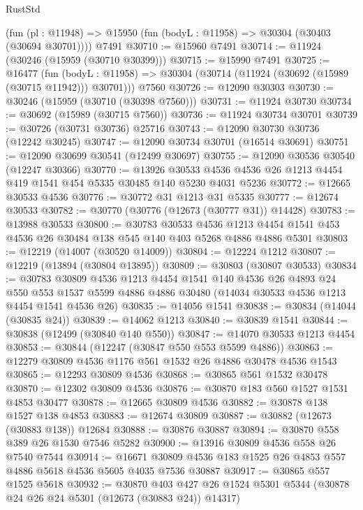\begin{lexlean}{RustStd}
\begin{coremodule}
    (fun (pl : @11948) => @15950 (fun (bodyL : @11958) => @30304 (@30403 (@30694 @30701))))
    @7491
@30710 := @15960 @7491
@30714 := @11924 (@30246 (@15959 (@30710 @30399)))
@30715 := @15990 @7491
@30725 := @16477
    (fun (bodyL : @11958) => @30304 (@30714 (@11924 (@30692 (@15989 (@30715 @11942))) @30701)))
    @7560
@30726 := @12090 @30303
@30730 := @30246 (@15959 (@30710 (@30398 @7560)))
@30731 := @11924 @30730
@30734 := @30692 (@15989 (@30715 @7560))
@30736 := @11924 @30734 @30701
@30739 := @30726 (@30731 @30736) @25716
@30743 := @12090 @30730 @30736 (@12242 @30245)
@30747 := @12090 @30734 @30701 (@16514 @30691)
@30751 := @12090 @30699 @30541 (@12499 @30697)
@30755 := @12090 @30536 @30540 (@12247 @30366)
@30770 := @13926
    @30533
    @4536
    @4536
    @26
    @1213
    @4454
    @419
    @1541
    @454
    @5335
    @30485
    @140
    @5230
    @4031
    @5236
@30772 := @12665 @30533 @4536
@30776 := @30772 @31 @1213 @31 @5335
@30777 := @12674 @30533
@30782 := @30770 (@30776 (@12673 (@30777 @31)) @14428)
@30783 := @13988 @30533
@30800 := @30783
    @30533
    @4536
    @1213
    @4454
    @1541
    @453
    @4536
    @26
    @30484
    @138
    @545
    @140
    @403
    @5268
    @4886
    @4886
    @5301
@30803 := @12219 (@14007 (@30520 @14009))
@30804 := @12224 @1212
@30807 := @12219 (@13894 (@30804 @13895))
@30809 := @30803 (@30807 @30533)
@30834 := @30783
    @30809
    @4536
    @1213
    @4454
    @1541
    @140
    @4536
    @26
    @4893
    @24
    @550
    @553
    @1537
    @5599
    @4886
    @4886
    @30480
    (@14034 @30533 @4536 @1213 @4454 @1541 @4536 @26)
@30835 := @14056 @1541
@30838 := @30834 (@14044 (@30835 @24))
@30839 := @14062 @1213
@30840 := @30839 @1541
@30844 := @30838 (@12499 (@30840 @140 @550))
@30847 := @14070 @30533 @1213 @4454
@30853 := @30844 (@12247 (@30847 @550 @553 @5599 @4886))
@30863 := @12279 @30809 @4536 @1176 @561 @1532 @26 @4886 @30478 @4536 @1543
@30865 := @12293 @30809 @4536
@30868 := @30865 @561 @1532 @30478
@30870 := @12302 @30809 @4536
@30876 := @30870 @183 @560 @1527 @1531 @4853 @30477
@30878 := @12665 @30809 @4536
@30882 := @30878 @138 @1527 @138 @4853
@30883 := @12674 @30809
@30887 := @30882 (@12673 (@30883 @138)) @12684
@30888 := @30876 @30887
@30894 := @30870 @558 @389 @26 @1530 @7546 @5282
@30900 := @13916 @30809 @4536 @558 @26 @7540 @7544
@30914 := @16671 @30809 @4536 @183 @1525 @26 @4853 @557 @4886 @5618 @4536 @5605 @4035 @7536 @30887
@30917 := @30865 @557 @1525 @5618
@30932 := @30870
    @403
    @427
    @26
    @1524
    @5301
    @5344
    (@30878 @24 @26 @24 @5301 (@12673 (@30883 @24)) @14317)

\end{coremodule}
\end{lexlean}
